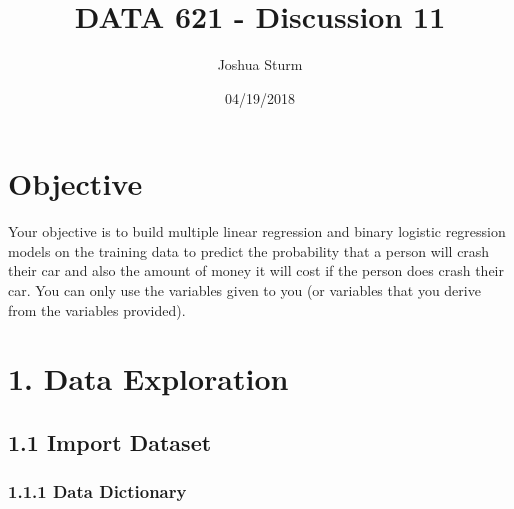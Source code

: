 \documentclass[]{article}
\title{DATA 621 - Discussion 11}
\author{Joshua Sturm}
\date{04/19/2018}
\begin{document}
\maketitle

\section{Objective}\label{objective}

Your objective is to build multiple linear regression and binary
logistic regression models on the training data to predict the
probability that a person will crash their car and also the amount of
money it will cost if the person does crash their car. You can only use
the variables given to you (or variables that you derive from the
variables provided).

\section{1. Data Exploration}\label{data-exploration}

\subsection{1.1 Import Dataset}\label{import-dataset}

\subsubsection{1.1.1 Data Dictionary}\label{data-dictionary}
\end{document}
